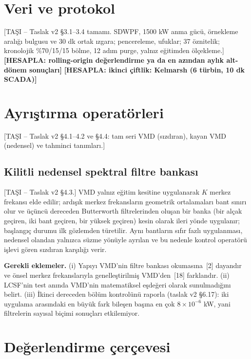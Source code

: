\documentclass[11pt,a4paper]{article}
\newcommand{\hesapla}[1]{\textbf{[HESAPLA: #1]}}
\newcommand{\tasi}[1]{\textsf{\small [TAŞI -- #1]}}
\begin{document}
\section{Veri ve protokol}
\tasi{Taslak v2 §3.1--3.4 tamamı. SDWPF, 1500 kW anma gücü, örnekleme aralığı
bulgusu ve 30 dk ortak ızgara; pencereleme, ufuklar; 37 öznitelik; kronolojik
\%70/15/15 bölme, 12 adım purge, yalnız eğitimden ölçekleme.}
\hesapla{rolling-origin değerlendirme ya da en azından aylık alt-dönem sonuçları}
\hesapla{ikinci çiftlik: Kelmarsh (6 türbin, 10 dk SCADA)}

\section{Ayrıştırma operatörleri}
\tasi{Taslak v2 §4.1--4.2 ve §4.4: tam seri VMD (sızdıran), kayan VMD
(nedensel) ve tahminci tanımları.}

\subsection{Kilitli nedensel spektral filtre bankası}
\tasi{Taslak v2 §4.3.} VMD yalnız eğitim kesitine uygulanarak $K$ merkez
frekansı elde edilir; ardışık merkez frekansların geometrik ortalamaları bant
sınırı olur ve üçüncü dereceden Butterworth filtrelerinden oluşan bir banka
(bir alçak geçiren, iki bant geçiren, bir yüksek geçiren) kesin olarak ileri
yönde uygulanır; başlangıç durumu ilk gözlemden türetilir. Aynı bantların sıfır
fazlı uygulanması, nedensel olandan yalnızca süzme yönüyle ayrılan ve bu nedenle
kontrol operatörü işlevi gören sızdıran karşılığı verir.

\textbf{Gerekli eklemeler.} (i) Yapıyı VMD'nin filtre bankası okumasına~[2]
dayandır ve önsel merkez frekanslarıyla genelleştirilmiş VMD'den~[18]
farklandır. (ii) LCSF'nin test anında VMD'nin matematiksel eşdeğeri olarak
sunulmadığını belirt. (iii) İkinci dereceden bölüm kontrolünü raporla (taslak v2
§6.17): iki uygulama arasındaki en büyük fark bileşen başına en çok
$8\times10^{-6}$ kW, yani filtrelerin sayısal biçimi sonuçları etkilemiyor.

\section{Değerlendirme çerçevesi}
\end{document}

